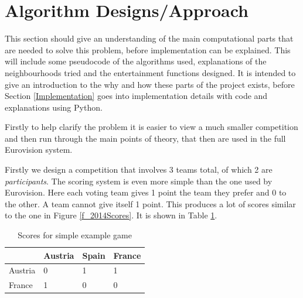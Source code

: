 \documentclass[12pt]{report}
\begin{document}
\section{Algorithm Designs/Approach}\label{AlgorithmDesigns}
This section should give an understanding of the main computational parts that are needed to solve this problem, before implementation can be explained. This will include some pseudocode of the algorithms used, explanations of the neighbourhoods tried and the entertainment functions designed. It is intended to give an introduction to the why and how these parts of the project exists, before Section \ref{Implementation} goes into implementation details with code and explanations using Python.

Firstly to help clarify the problem it is easier to view a much smaller competition and then run through the main points of theory, that then are used in the full Eurovision system.

Firstly we design a competition that involves 3 teams total, of which 2 are \textit{participants}. The scoring system is even more simple than the one used by Eurovision. Here each voting team gives 1 point the team they prefer and 0 to the other. A team cannot give itself 1 point. This produces a lot of scores similar to the one in Figure \ref{f_2014Scores}. It is shown in Table \ref{t_simpleMatrix}.

\begin{table}[H]
\centering
\caption{Scores for simple example game}
\label{t_simpleMatrix}
\begin{tabular}{@{}|l|l|l|l|@{}}
\toprule
        & Austria & Spain & France \\ \midrule
Austria & 0       & 1     & 1      \\ \midrule
France  & 1       & 0     & 0      \\ \bottomrule
\end{tabular}
\end{table}
\end{document}

